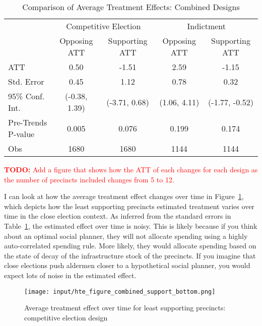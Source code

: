 \begin{table}[ht]
    \centering
    \caption{Comparison of Average Treatment Effects: Combined Designs}
    \label{tab:att_comparison_combined}
    \begin{tabular}{lcc|cc}
    \hline
     & \multicolumn{2}{c|}{Competitive Election} & \multicolumn{2}{c}{Indictment} \\
     & Opposing ATT & Supporting ATT & Opposing ATT & Supporting ATT \\
    \hline
    ATT & 0.50 & -1.51 & 2.59 & -1.15 \\
    Std. Error & 0.45 & 1.12 & 0.78 & 0.32 \\
    95\% Conf. Int. & (-0.38, 1.39) & (-3.71, 0.68) & (1.06, 4.11) & (-1.77, -0.52) \\
    Pre-Trends P-value & 0.005  & 0.076 & 0.199 & 0.174 \\
    Obs & 1680 & 1680 & 1144 & 1144 \\
    \hline
    \end{tabular}
\end{table}

\textcolor{red}{\textbf{TODO:} Add a figure that shows how the ATT of each changes for each design as the number of precincts included changes from 5 to 12.}

I can look at how the average treatment effect changes over time in Figure~\ref{fig:att_comparison_close_election_bottom}, which depicts how the least supporting precincts estimated treatment varies over time in the close election context.
As inferred from the standard errors in Table~\ref{tab:att_comparison_combined}, the estimated effect over time is noisy.
This is likely because if you think about an optimal social planner, they will not allocate spending using a highly auto-correlated spending rule.
More likely, they would allocate spending based on the state of decay of the infrastructure stock of the precincts.
If you imagine that close elections push aldermen closer to a hypothetical social planner, you would expect lots of noise in the estimated effect.

\begin{figure}[ht]
    \centering
    \texttt{[image: input/hte\_figure\_combined\_support\_bottom.png]}
    \caption{Average treatment effect over time for least supporting precincts: competitive election design}
    \label{fig:att_comparison_close_election_bottom}
\end{figure}


